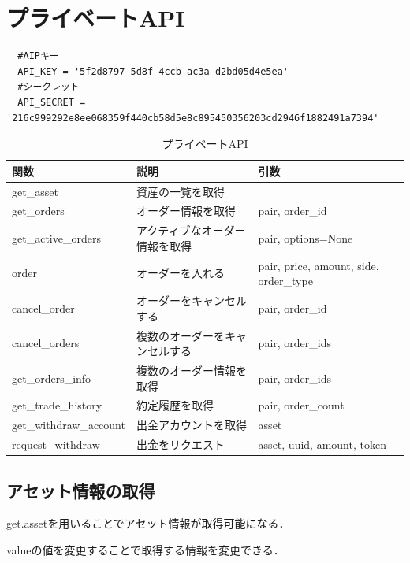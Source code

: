 \section{プライベートAPI}
\begin{verbatim}
  #AIPキー
  API_KEY = '5f2d8797-5d8f-4ccb-ac3a-d2bd05d4e5ea'
  #シークレット
  API_SECRET = '216c999292e8ee068359f440cb58d5e8c895450356203cd2946f1882491a7394'
\end{verbatim}

\begin{table}[htbp]
  \caption{プライベートAPI}
  \label{tab:API}
  \begin{tabular}{lll}
  関数                     & 説明              & 引数                                     \\ \hline
  get\_asset             & 資産の一覧を取得        &                                        \\
  get\_orders            & オーダー情報を取得       & pair, order\_id                        \\
  get\_active\_orders    & アクティブなオーダー情報を取得 & pair, options=None                     \\
  order                  & オーダーを入れる        & pair, price, amount, side, order\_type \\
  cancel\_order          & オーダーをキャンセルする    & pair, order\_id                        \\
  cancel\_orders         & 複数のオーダーをキャンセルする & pair, order\_ids                       \\
  get\_orders\_info      & 複数のオーダー情報を取得    & pair, order\_ids                       \\
  get\_trade\_history    & 約定履歴を取得         & pair, order\_count                     \\
  get\_withdraw\_account & 出金アカウントを取得      & asset                                  \\
  request\_withdraw      & 出金をリクエスト        & asset, uuid, amount, token            
  \end{tabular}
  \end{table}

\newpage

\subsection{アセット情報の取得}
get.assetを用いることでアセット情報が取得可能になる．

valueの値を変更することで取得する情報を変更できる．
\newpage

